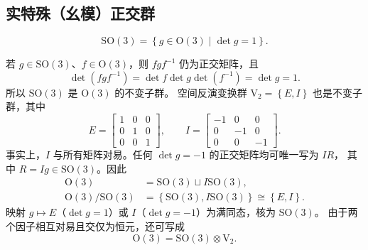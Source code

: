 \subsection{实特殊（幺模）正交群}
\begin{definition}
\begin{equation}
\mathrm{SO}\left(3\right)=\left\{g\in\mathrm{O}\left(3\right)\mid\det g=1\right\}.
\end{equation}
\end{definition}
若 $g\in\mathrm{SO}\left(3\right)$、$f\in\mathrm{O}\left(3\right)$，则 $fgf^{-1}$ 仍为正交矩阵，且
\begin{equation}
\det\left(fgf^{-1}\right)=\det f\det g\det\left(f^{-1}\right)=\det g=1.
\end{equation}
所以 $\mathrm{SO}\left(3\right)$ 是 $\mathrm{O}\left(3\right)$ 的不变子群。
空间反演变换群 $\mathrm{V}_2=\left\{E,I\right\}$ 也是不变子群，其中
\begin{equation}
E=\begin{bmatrix}1&0&0\\0&1&0\\0&0&1\end{bmatrix},\qquad
I=\begin{bmatrix}-1&0&0\\0&-1&0\\0&0&-1\end{bmatrix}.
\end{equation}
事实上，$I$ 与所有矩阵对易。任何 $\det g=-1$ 的正交矩阵均可唯一写为 $IR$，
其中 $R=Ig\in\mathrm{SO}\left(3\right)$。因此
\begin{align}
\mathrm{O}\left(3\right)&=\mathrm{SO}\left(3\right)\sqcup I\mathrm{SO}\left(3\right),\\
\mathrm{O}\left(3\right)/\mathrm{SO}\left(3\right)&=\left\{\mathrm{SO}\left(3\right),I\mathrm{SO}\left(3\right)\right\}\cong\left\{E,I\right\}.
\end{align}
映射 $g\mapsto E$（$\det g=1$）或 $I$（$\det g=-1$）为满同态，核为 $\mathrm{SO}\left(3\right)$。
由于两个因子相互对易且交仅为恒元，还可写成
\begin{equation}
\mathrm{O}\left(3\right)=\mathrm{SO}\left(3\right)\otimes\mathrm{V}_2.
\end{equation}

